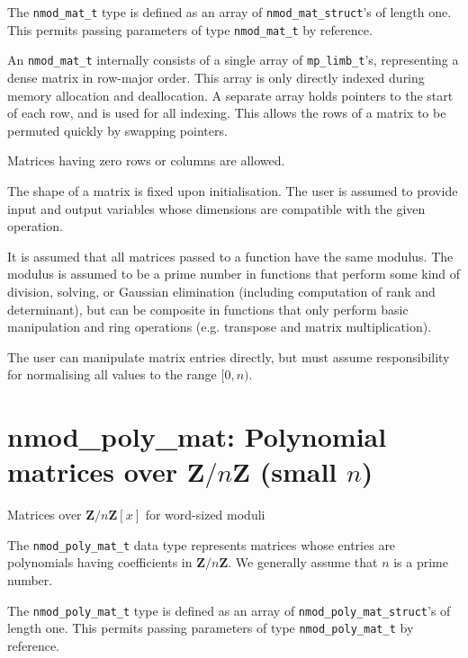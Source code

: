 \documentclass[a4paper,10pt]{book}
\newcommand{\Z}{\mathbf{Z}}%
\newcommand{\code}{\lstinline}
\begin{document}
{{The \code{nmod_mat_t} type is defined as an array of
\code{nmod_mat_struct}'s of length one.
This  permits passing parameters of type \code{nmod_mat_t}
by reference.

An \code{nmod_mat_t} internally consists of a single array of
\code{mp_limb_t}'s, representing a dense matrix in row-major order.
This array is only directly indexed during memory allocation and
deallocation. A separate array holds pointers to the start of each
row, and is used for all indexing. This allows the rows of a matrix
to be permuted quickly by swapping pointers.

Matrices having zero rows or columns are allowed.

The shape of a matrix is fixed upon initialisation.
The user is assumed to provide input and output variables
whose dimensions are compatible with the given operation.

It is assumed that all matrices passed to a function have the same modulus.
The modulus is assumed to be a prime number in functions that
perform some kind of division, solving, or Gaussian elimination
(including computation of rank and determinant),
but can be composite in functions that only perform basic manipulation
and ring operations (e.g. transpose and matrix multiplication).

The user can manipulate matrix entries directly, but must
assume responsibility for normalising all values to the range $[0, n)$.




\chapter{nmod\_poly\_mat: Polynomial matrices over $\Z/n\Z$ (small $n$)}
\epigraph{Matrices over $\Z / n \Z[x]$ for word-sized moduli}{}

The \code{nmod_poly_mat_t} data type represents matrices whose
entries are polynomials having coefficients in $\Z / n \Z$.
We generally assume that $n$ is a prime number.

The \code{nmod_poly_mat_t} type is defined as an array of
\code{nmod_poly_mat_struct}'s of length one.
This permits passing parameters of type \code{nmod_poly_mat_t}
by reference.

}}
\end{document}
